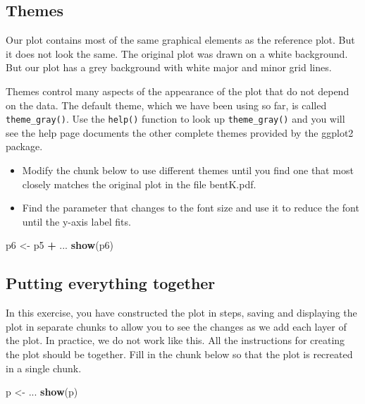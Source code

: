 \documentclass[
]{book}
\newenvironment{Shaded}{\begin{snugshade}}{\end{snugshade}}
\newcommand{\FunctionTok}[1]{\textcolor[rgb]{0.13,0.29,0.53}{\textbf{#1}}}
\newcommand{\NormalTok}[1]{#1}
\newcommand{\OtherTok}[1]{\textcolor[rgb]{0.56,0.35,0.01}{#1}}
\newcommand{\SpecialCharTok}[1]{\textcolor[rgb]{0.81,0.36,0.00}{\textbf{#1}}}
\providecommand{\tightlist}{%
  \setlength{\itemsep}{0pt}\setlength{\parskip}{0pt}}
\begin{document}
\subsection{Themes}\label{themes}

Our plot contains most of the same graphical elements as the reference plot. But it does not look the same. The original plot was drawn on a white background. But our plot has a grey background with white major and minor grid lines.

Themes control many aspects of the appearance of the plot that do not depend on the data. The default theme, which we have been using so far, is called \texttt{theme\_gray()}. Use the \texttt{help()} function to look up \texttt{theme\_gray()} and you will see the help page documents the other complete themes provided by the ggplot2 package.

\begin{itemize}
\tightlist
\item
  Modify the chunk below to use different themes until you find one that most closely matches the original plot in the file bentK.pdf.
\item
  Find the parameter that changes to the font size and use it to reduce the font until the y-axis label fits.
\end{itemize}

\begin{Shaded}
\begin{Highlighting}[]
\NormalTok{p6 }\OtherTok{\textless{}{-}}\NormalTok{ p5 }\SpecialCharTok{+}\NormalTok{ ...}
\FunctionTok{show}\NormalTok{(p6)}
\end{Highlighting}
\end{Shaded}

\subsection{Putting everything together}\label{putting-everything-together}

In this exercise, you have constructed the plot in steps, saving and displaying the plot in separate chunks to allow you to see the changes as we add each layer of the plot. In practice, we do not work like this. All the instructions for creating the plot should be together. Fill in the chunk below so that the plot is recreated in a single chunk.

\begin{Shaded}
\begin{Highlighting}[]
\NormalTok{p }\OtherTok{\textless{}{-}}\NormalTok{ ...}
\FunctionTok{show}\NormalTok{(p)}
\end{Highlighting}
\end{Shaded}
\end{document}
